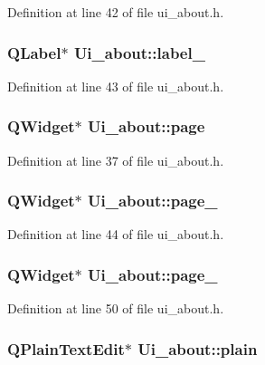 Definition at line 42 of file ui\_\-about.h.

\hypertarget{classUi__about_aa459ebfad1e0a2648d20c60d4c6fc115}{
\subsubsection[{label\_\-6}]{\setlength{\rightskip}{0pt plus 5cm}QLabel$\ast$ {\bf Ui\_\-about::label\_}}}
\label{classUi__about_aa459ebfad1e0a2648d20c60d4c6fc115}


Definition at line 43 of file ui\_\-about.h.

\hypertarget{classUi__about_acdbd820c02029d71cfc119a9832fef24}{
\subsubsection[{page}]{\setlength{\rightskip}{0pt plus 5cm}QWidget$\ast$ {\bf Ui\_\-about::page}}}
\label{classUi__about_acdbd820c02029d71cfc119a9832fef24}


Definition at line 37 of file ui\_\-about.h.

\hypertarget{classUi__about_ae8fa17161b240480e903aea6b9ada290}{
\subsubsection[{page\_\-2}]{\setlength{\rightskip}{0pt plus 5cm}QWidget$\ast$ {\bf Ui\_\-about::page\_}}}
\label{classUi__about_ae8fa17161b240480e903aea6b9ada290}


Definition at line 44 of file ui\_\-about.h.

\hypertarget{classUi__about_ab53caedb09cc7a40a6ebd02032006b81}{
\subsubsection[{page\_\-3}]{\setlength{\rightskip}{0pt plus 5cm}QWidget$\ast$ {\bf Ui\_\-about::page\_}}}
\label{classUi__about_ab53caedb09cc7a40a6ebd02032006b81}


Definition at line 50 of file ui\_\-about.h.

\hypertarget{classUi__about_a0469ccb1dc32f0b8e757e59148ae3467}{
\subsubsection[{plain}]{\setlength{\rightskip}{0pt plus 5cm}QPlainTextEdit$\ast$ {\bf Ui\_\-about::plain}}}
\label{classUi__about_a0469ccb1dc32f0b8e757e59148ae3467}


